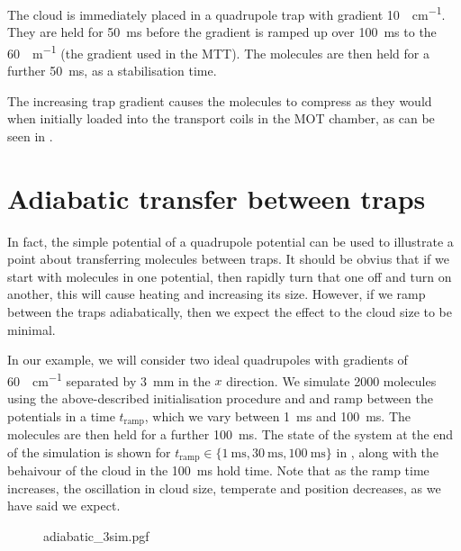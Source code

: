 The cloud is immediately placed in a quadrupole trap with gradient
\SI{10}{\gauss\per\centi\meter}. They are held for \SI{50}{\milli\second}
before the gradient is ramped up over \SI{100}{\milli\second} to the 
\SI{60}{\gauss\per\meter} (the gradient used in the MTT).
The molecules are then held for a further \SI{50}{\milli\second}, as a
stabilisation time.

The increasing trap gradient causes the
molecules to compress as they would when initially loaded into the transport
coils in the MOT chamber, as can be seen in \myfigref{}.

\section{Adiabatic transfer between traps}


In fact, the simple potential of a quadrupole potential can be used to
illustrate a point about transferring molecules between traps. It should be
obvius that if we start with molecules in one potential, then rapidly turn that
one off and turn on another, this will cause heating and increasing its size.
However, if we ramp between the traps adiabatically, then we expect the effect
to the cloud size to be minimal.

In our example, we will consider two ideal quadrupoles with gradients of
\SI{60}{\gauss\per\centi\meter} separated by \SI{3}{\milli\meter} in the $x$
direction. We simulate 2000  molecules using the above-described
initialisation procedure and  and ramp between the
potentials in a time $t_\text{ramp}$, which we vary between
\SI{1}{\milli\second} and \SI{100}{\milli\second}. The molecules are then held
for a further \SI{100}{\milli\second}. The state of the system at the end of
the simulation is shown for $t_\text{ramp}\in \{\SI{1}{\milli\second},
\SI{30}{\milli\second}, \SI{100}{\milli\second}\}$ in , along with
the behaivour of the cloud in the \SI{100}{\milli\second} hold time. Note that
as the ramp time increases, the oscillation in cloud size, temperate and
position decreases, as we have said we expect.

\begin{figure}[p]
\centering
  {adiabatic_3sim.pgf}
  \caption{
  }
  \label{design:fig:adia3sim}
\end{figure}


